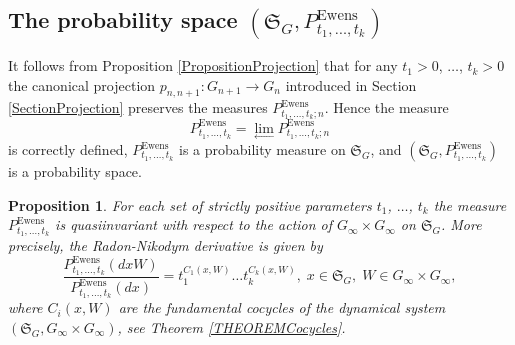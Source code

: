 \documentclass[12pt]{amsart}
\newtheorem{prop}[thm]{Proposition}
\theoremstyle{definition}
\numberwithin{equation}{section}
\DeclareMathOperator{\Ewens}{Ewens}
\begin{document}
\subsection{The probability space $\left(\mathfrak{S}_{G},P_{t_1,\ldots,t_k}^{\Ewens}\right)$}
\label{SectionProbSpaceConstruction}
 It follows from Proposition \ref{PropositionProjection} that for any $t_1>0$, $\ldots$, $t_k>0$ the canonical projection $p_{n,n+1}: G_{n+1}\rightarrow G_n$ introduced in Section \ref{SectionProjection} preserves the measures $P_{t_1,\ldots,t_k;n}^{\Ewens}$. Hence the measure
$$
P_{t_1,\ldots,t_k}^{\Ewens}=\underset{\longleftarrow}{\lim}P_{t_1,\ldots,t_k;n}^{\Ewens}
$$
is correctly defined, $P_{t_1,\ldots,t_k}^{\Ewens}$ is a probability measure on $\mathfrak{S}_{G}$, and
$\left(\mathfrak{S}_{G},P_{t_1,\ldots,t_k}^{\Ewens}\right)$ is a probability space.
\begin{prop}\label{Proposition5.1.1} For each set of strictly positive parameters $t_1$, $\ldots$, $t_k$
the measure $P_{t_1,\ldots,t_k}^{\Ewens}$ is quasiinvariant with respect to the action of $G_{\infty}\times G_{\infty}$ on $\mathfrak{S}_{G}$. More precisely, the Radon-Nikodym derivative is given by
\begin{equation}\label{5.1.1.1}
\frac{P_{t_1,\ldots,t_k}^{\Ewens}\left(dxW\right)}{P_{t_1,\ldots,t_k}^{\Ewens}(dx)}
=t_1^{C_1\left(x,W\right)}\ldots t_k^{C_k\left(x,W\right)},
\; x\in\mathfrak{S}_{G},\; W\in G_{\infty}\times  G_{\infty},
\end{equation}
where $C_i\left(x,W\right)$ are the fundamental cocycles of the dynamical system
$\left(\mathfrak{S}_G, G_{\infty}\times G_{\infty}\right)$, see Theorem \ref{THEOREMCocycles}.
\end{prop}
\end{document}
